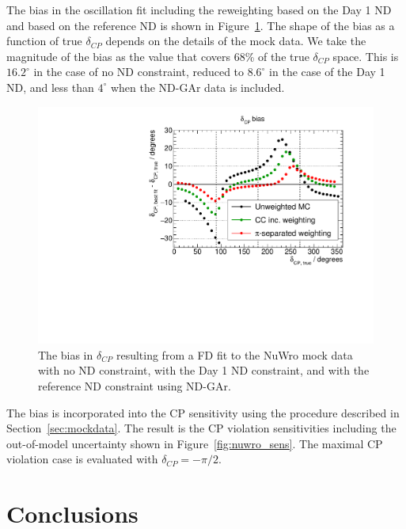 \documentclass[11pt]{article}
\begin{document}
The bias in the oscillation fit including the reweighting based on the Day 1 ND and based on the reference ND is shown in Figure~\ref{fig:biasresults}. The shape of the bias as a function of true $\delta_{CP}$ depends on the details of the mock data. We take the magnitude of the bias as the value that covers 68\% of the true $\delta_{CP}$ space. This is $16.2^{\circ}$ in the case of no ND constraint, reduced to $8.6^{\circ}$ in the case of the Day 1 ND, and less than $4^{\circ}$ when the ND-GAr data is included.

\begin{figure}[h]
\centering
\includegraphics[width=0.9\columnwidth]{graphics/PiStudyBiasWithGAr.pdf}
\caption{The bias in $\delta_{CP}$ resulting from a FD fit to the NuWro mock data with no ND constraint, with the Day 1 ND constraint, and with the reference ND constraint using ND-GAr.}
\label{fig:biasresults}
\end{figure}

The bias is incorporated into the CP sensitivity using the procedure described in Section~\ref{sec:mockdata}. The result is the CP violation sensitivities including the out-of-model uncertainty shown in Figure~\ref{fig:nuwro_sens}. The maximal CP violation case is evaluated with $\delta_{CP} = -\pi/2$.

\section{Conclusions}
\label{sec:conclusions}
\end{document}
